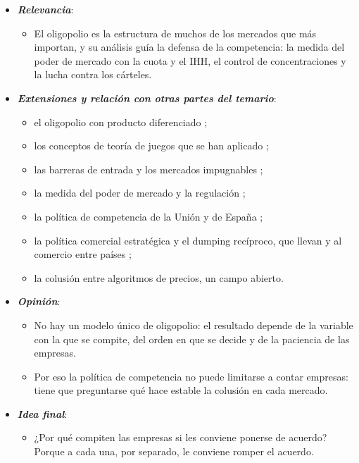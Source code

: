 \documentclass[11pt]{article}
\begin{document}
\begin{itemize}
\begin{itemize}
  \item Y si se ponen de acuerdo, el cártel actúa como un monopolista con varias plantas y reparte lo ganado según lo que cada empresa obtendría compitiendo; pero el acuerdo no es un equilibrio y nadie puede hacerlo cumplir ante un juez.
  \end{itemize}
\item \textbf{\emph{Relevancia}}:
  \begin{itemize}
  \item El oligopolio es la estructura de muchos de los mercados que más importan, y su análisis guía la defensa de la competencia: la medida del poder de mercado con la cuota y el IHH, el control de concentraciones y la lucha contra los cárteles.
  \end{itemize}
\item \textbf{\emph{Extensiones y relación con otras partes del temario}}:
  \begin{itemize}
  \item el oligopolio con producto diferenciado ;
  \item los conceptos de teoría de juegos que se han aplicado ;
  \item las barreras de entrada y los mercados impugnables ;
  \item la medida del poder de mercado y la regulación ;
  \item la política de competencia de la Unión  y de España ;
  \item la política comercial estratégica y el dumping recíproco, que llevan  y  al comercio entre países  ;
  \item la colusión entre algoritmos de precios, un campo abierto.
  \end{itemize}
\item \textbf{\emph{Opinión}}:
  \begin{itemize}
  \item No hay un modelo único de oligopolio: el resultado depende de la variable con la que se compite, del orden en que se decide y de la paciencia de las empresas.

  \item Por eso la política de competencia no puede limitarse a contar empresas: tiene que preguntarse qué hace estable la colusión en cada mercado.
  \end{itemize}
\item \textbf{\emph{Idea final}}:
  \begin{itemize}
  \item ¿Por qué compiten las empresas si les conviene ponerse de acuerdo? Porque a cada una, por separado, le conviene romper el acuerdo.


\end{itemize}
\end{itemize}
\end{document}
